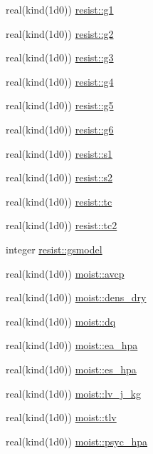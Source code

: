 \begin{DoxyCompactItemize}
real(kind(1d0)) \hyperlink{namespaceresist_a55e0021876c70be1f609dc187f92f705}{resist\+::g1}
\item 
real(kind(1d0)) \hyperlink{namespaceresist_a98bae857808870e126fd947cdb3b9b14}{resist\+::g2}
\item 
real(kind(1d0)) \hyperlink{namespaceresist_a35b3f7080e2cc3d5883dbd59f8cfb21b}{resist\+::g3}
\item 
real(kind(1d0)) \hyperlink{namespaceresist_a9d34a5c68ab32cd207e570225330120b}{resist\+::g4}
\item 
real(kind(1d0)) \hyperlink{namespaceresist_aca3b131857592b71ec28cce48a2fb0ee}{resist\+::g5}
\item 
real(kind(1d0)) \hyperlink{namespaceresist_a7ad9926600ac79377439521a837b21de}{resist\+::g6}
\item 
real(kind(1d0)) \hyperlink{namespaceresist_a8ce25344e41b31f4da68572adc0b8391}{resist\+::s1}
\item 
real(kind(1d0)) \hyperlink{namespaceresist_a0edd3d2ed03de65fa65ffe839661d97c}{resist\+::s2}
\item 
real(kind(1d0)) \hyperlink{namespaceresist_a018715832aa4e47e3fd4deb59e413da1}{resist\+::tc}
\item 
real(kind(1d0)) \hyperlink{namespaceresist_a39c5aa18f024567bd7365dbdfe6c7216}{resist\+::tc2}
\item 
integer \hyperlink{namespaceresist_a89895984ab23ef2627cb851eadd8b858}{resist\+::gsmodel}
\item 
real(kind(1d0)) \hyperlink{namespacemoist_ab97dbf8fcbd5d11d712712430254200c}{moist\+::avcp}
\item 
real(kind(1d0)) \hyperlink{namespacemoist_a86e17481beeffe41b498ff747fc52360}{moist\+::dens\+\_\+dry}
\item 
real(kind(1d0)) \hyperlink{namespacemoist_ac54b9750ff8d2f544e3706dc3c7ea73d}{moist\+::dq}
\item 
real(kind(1d0)) \hyperlink{namespacemoist_a19f55d056cfde820ca8beafe774a0688}{moist\+::ea\+\_\+hpa}
\item 
real(kind(1d0)) \hyperlink{namespacemoist_a711adf6d19a4bb7b9a6c55d39dd5357b}{moist\+::es\+\_\+hpa}
\item 
real(kind(1d0)) \hyperlink{namespacemoist_a59a8f410cf3ebfe343d9c01b5dbb2cf8}{moist\+::lv\+\_\+j\+\_\+kg}
\item 
real(kind(1d0)) \hyperlink{namespacemoist_a4572c899e5e83d9647c7ed9f16901c24}{moist\+::tlv}
\item 
real(kind(1d0)) \hyperlink{namespacemoist_a8a8d0c665be356954056ed6c102b953b}{moist\+::psyc\+\_\+hpa}

\end{DoxyCompactItemize}
